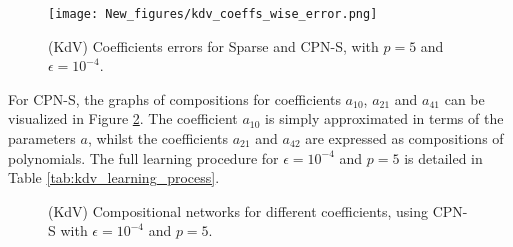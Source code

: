  
\begin{figure}
    \centering
    \texttt{[image: New\_figures/kdv\_coeffs\_wise\_error.png]}
    \caption{(KdV) Coefficients errors for Sparse and CPN-S, with $p=5$ and $\epsilon=10^{-4}$.}
    \label{fig:pcnvssparse}
\end{figure}

 
 For CPN-S, the graphs of compositions for coefficients $a_{10}$, $a_{21}$ and $a_{41}$ can be visualized in Figure \ref{fig:kdv_graphs}. The coefficient $a_{10}$ is simply approximated in terms of the parameters $a$, whilst the coefficients $ a_{21} $ and $ a_{42} $ are expressed as compositions of polynomials. The full learning procedure for $ \epsilon = 10^{-4} $ and $ p = 5 $ is detailed in Table \ref{tab:kdv_learning_process}.


\begin{figure}
    \centering
    \caption{(KdV) Compositional networks for different coefficients, using CPN-S with $\epsilon=10^{-4}$ and $p=5$.}
    \label{fig:kdv_graphs}
\end{figure}

